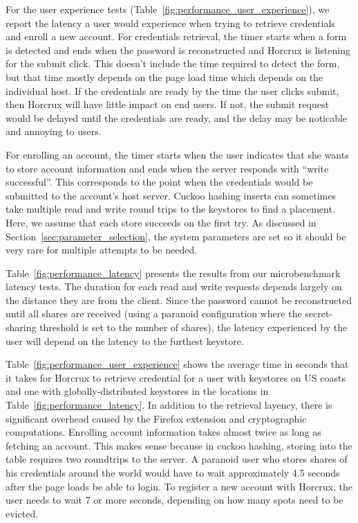 For the user experience tests (Table~\ref{fig:performance_user_experience}), we report the latency a user would experience when trying to retrieve credentials and enroll a new account. For credentials retrieval, the timer starts when a form is detected and ends when the password is reconstructed and Horcrux is listening for the submit click. This doesn't include the time required to detect the form, but that time mostly depends on the page load time which depends on the individual host. If the credentials are ready by the time the user clicks submit, then Horcrux will have little impact on end users. If not, the submit request would be delayed until the credentials are ready, and the delay may be noticable and annoying to users.

For enrolling an account, the timer starts when the user indicates that she wants to store account information and ends when the server responds with ``write successful''. This corresponds to the point when the credentials would be submitted to the account's host server. Cuckoo hashing inserts can sometimes take multiple read and write round trips to the keystores to find a placement. Here, we assume that each store succeeds on the first try. As discussed in Section~\ref{sec:parameter_selection}, the system parameters are set so it should be very rare for multiple attempts to be needed.

Table~\ref{fig:performance_latency} presents the results from our microbenchmark latency tests. The duration for each read and write requests depends largely on the distance they are from the client.  Since the password cannot be reconstructed until all shares are received (using a paranoid configuration where the secret-sharing threshold is set to the number of shares), the latency experienced by the user will depend on the latency to the furthest keystore.

Table~\ref{fig:performance_user_experience} shows the average time in seconds that it takes for Horcrux to retrieve credential for a user with keystores on US coasts and one with globally-distributed keystores in the locations in Table~\ref{fig:performance_latency}.  In addition to the retrieval layency, there is significant overhead caused by the Firefox extension and cryptographic computations. Enrolling account information takes almost twice as long as fetching an account. This makes sense because in cuckoo hashing, storing into the table requires two roundtrips to the server. A paranoid user who stores shares of his credentials around the world would have to wait approximately 4.5 seconds after the page loads be able to login. To register a new account with Horcrux, the user needs to wait 7 or more seconds, depending on how many spots need to be evicted. 

